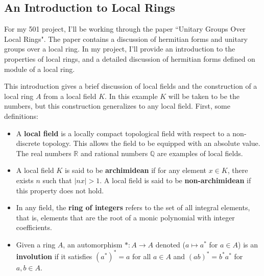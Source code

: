 \begin{center}
\section*{An Introduction to Local Rings}
\end{center}

For my 501 project, I'll be working through the paper ``Unitary Groups Over Local Rings"\cite{cruickshank}.
The paper contains a discussion of hermitian forms and unitary groups over a local ring.
In my project, I'll provide an introduction to the properties of local rings, and a detailed discussion of hermitian forms
defined on module of a local ring.

This introduction gives a brief discussion of local fields and the construction of a local ring $A$ from a local field $K$.
In this example $K$ will be taken to be the \padic numbers, but this construction generalizes to any local field.
First, some definitions:

\begin{itemize}[noitemsep]
\item A \textbf{local field} is a locally compact topological field with respect to a non-discrete topology.
This allows the field to be equipped with an absolute value.
The real numbers $\mathbb{R}$ and rational numbers $\mathbb{Q}$ are examples of local fields.
\item A local field $K$ is said to be \textbf{archimidean} if for any element $x \in K$, there exists $n$ such that $|nx| > 1$.
A local field is said to be \textbf{non-archimidean} if this property does not hold.
\item In any field, the \textbf{ring of integers} refers to the set of all integral elements, that is, 
elements that are the root of a monic polynomial with integer coefficients.
\item Given a ring $A$, an automorphism $*: A \to A$ denoted ($a \mapsto a^*$ for $a \in A$) is an \textbf{involution} 
if it satisfies $(a^*)^* = a$ for all $a \in A$ and $(ab)^* = b^* a^*$ for $a, b \in A$.
\end{itemize}

